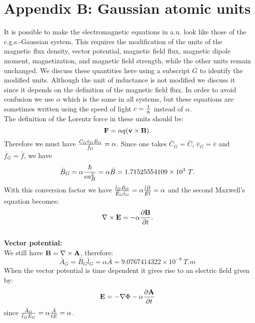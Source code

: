 \documentclass[12pt,a4paper]{article}
\def\barbg{1.71525554109\times 10^{3}}
\def\baravg{9.0767414322\times 10^{-8}}
\begin{document}
\section{\color{coral} Appendix B: Gaussian atomic units}

{\color{steelblue}
It is possible to make the electromagnetic equations in a.u. look like 
those of the c.g.s.-Gaussian system. This requires the modification of 
the units of the magnetic flux density, vector potential, magnetic field 
flux, magnetic dipole moment, magnetization, and magnetic field strength, 
while the other units remain unchanged. 
We discuss these quantities here using a subscript $G$ to identify the
modified units. Although the unit of inductance is not modified 
we discuss it since it depends on the definition of the magnetic field flux.
In order to avoid confusion we use $\alpha$ which is the same in all
systems, but these equations are sometimes written using the speed of light
$c={1\over \alpha}$ instead of $\alpha$.
\\

The definition of the Lorentz force in these units should be:
\begin{equation}
{\bf F}=\alpha q ({\bf v}\times {\bf B}).
\end{equation}
Therefore we must have
${\bar C_G \bar v_G \bar B_G \over \bar f_G} = \alpha$. Since one
takes $\bar C_G=\bar C$, $\bar v_G=\bar v$ and $\bar f_G=\bar f$, we have 
\begin{equation}
\bar B_G=\alpha {\hbar \over e a_B^2}=\alpha \bar B=\barbg\ T.
\end{equation}
With this conversion factor we have ${\bar l_G \bar B_G \over \bar E_G
\bar t_G}=\alpha {\bar l \bar B \over \bar E
\bar t}=\alpha$ and the second Maxwell's equation becomes:
\begin{equation}
\nabla \times {\bf E}=-\alpha {\partial {\bf B} \over \partial t}.
\end{equation}\\
{\bf Vector potential:\\}
We still have ${\bf B}=\nabla \times {\bf A}$, therefore:
\begin{equation}
\bar A_G=\bar B_G \bar l_G=\alpha \bar A= \baravg\ T.m
\end{equation}
When the vector potential is time dependent it gives rise to an electric field
given by:
\begin{equation}
{\bf E}=-\nabla \Phi - \alpha {\partial {\bf A} \over \partial t}
\end{equation}
since ${\bar A_G \over \bar t_G \bar E_G}=\alpha
{\bar A \over \bar t \bar E}=\alpha$.\\

}
\end{document}
